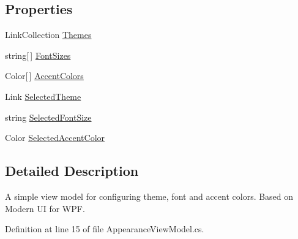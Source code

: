 \subsection*{Properties}
\begin{DoxyCompactItemize}
\item 
Link\+Collection \hyperlink{class_mufasa_1_1_pages_1_1_settings_1_1_appearance_view_model_a7200169bb6a6634ef182b3c6f009aadc}{Themes}
\item 
string\mbox{[}$\,$\mbox{]} \hyperlink{class_mufasa_1_1_pages_1_1_settings_1_1_appearance_view_model_a77b2730df4a6e54d7673bfa5062df9db}{Font\+Sizes}
\item 
Color\mbox{[}$\,$\mbox{]} \hyperlink{class_mufasa_1_1_pages_1_1_settings_1_1_appearance_view_model_a8e50563e009f9175bae8831acaed92c9}{Accent\+Colors}
\item 
Link \hyperlink{class_mufasa_1_1_pages_1_1_settings_1_1_appearance_view_model_a65d57427e4dffeb4a11a97f5ac1b6661}{Selected\+Theme}
\item 
string \hyperlink{class_mufasa_1_1_pages_1_1_settings_1_1_appearance_view_model_a7821fc1ee0e5e68bfdd2678076c17ef0}{Selected\+Font\+Size}
\item 
Color \hyperlink{class_mufasa_1_1_pages_1_1_settings_1_1_appearance_view_model_a29908e1c79504ddac58456e8ca9f37a4}{Selected\+Accent\+Color}
\end{DoxyCompactItemize}


\subsection{Detailed Description}
A simple view model for configuring theme, font and accent colors. Based on Modern U\+I for W\+P\+F. 



Definition at line 15 of file Appearance\+View\+Model.\+cs.



